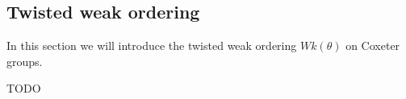 \subsection{Twisted weak ordering}
\label{sec:twisted-involutions-twisted-weak-ordering}

In this section we will introduce the twisted weak ordering $Wk(\theta)$ on Coxeter groups. 

TODO